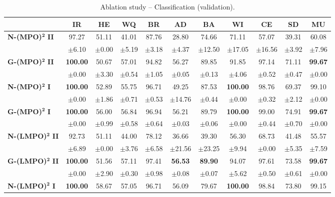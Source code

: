 \begin{table}[ht]
\centering
\small
\caption{Ablation study -- Classification (validation).}
\label{tab:ablation_classification}
\begin{tabular}{lcccccccccc}
\toprule
& IR & HE & WQ & BR & AD & BA & WI & CE & SD & MU \\
\midrule
\textbf{N-(MPO)}$\bm{^2}$ \textbf{II} & 97.27 & 51.11 & 41.01 & 87.76 & 28.80 & 74.66 & 71.11 & 57.07 & 39.31 & 60.08 \\
 & $\pm$6.10 & $\pm$0.00 & $\pm$5.19 & $\pm$3.18 & $\pm$4.37 & $\pm$12.50 & $\pm$17.05 & $\pm$16.56 & $\pm$3.92 & $\pm$7.96 \\
\midrule
\textbf{G-(MPO)}$\bm{^2}$ \textbf{II} & \textbf{100.00} & 50.67 & 57.01 & 94.82 & 56.27 & 89.85 & 91.85 & 97.14 & 71.11 & \textbf{99.67} \\
 & $\pm$0.00 & $\pm$3.30 & $\pm$0.54 & $\pm$1.05 & $\pm$0.05 & $\pm$0.13 & $\pm$4.06 & $\pm$0.52 & $\pm$0.47 & $\pm$0.00 \\
\midrule
\textbf{N-(MPO)}$\bm{^2}$ \textbf{I} & \textbf{100.00} & 52.89 & 55.75 & 96.71 & 49.25 & 87.53 & \textbf{100.00} & 98.76 & 69.37 & 99.10 \\
 & $\pm$0.00 & $\pm$1.86 & $\pm$0.71 & $\pm$0.53 & $\pm$14.76 & $\pm$0.44 & $\pm$0.00 & $\pm$0.32 & $\pm$2.12 & $\pm$0.00 \\
\midrule
\textbf{G-(MPO)}$\bm{^2}$ \textbf{I} & \textbf{100.00} & 56.00 & 56.84 & 96.94 & 56.21 & 89.79 & \textbf{100.00} & 99.00 & 74.91 & \textbf{99.67} \\
 & $\pm$0.00 & $\pm$0.99 & $\pm$0.58 & $\pm$0.64 & $\pm$0.03 & $\pm$0.06 & $\pm$0.00 & $\pm$0.44 & $\pm$0.70 & $\pm$0.00 \\
\midrule
\textbf{N-(LMPO)}$\bm{^2}$ \textbf{II} & 92.73 & 51.11 & 44.00 & 78.12 & 36.66 & 39.30 & 56.30 & 68.73 & 41.48 & 55.57 \\
 & $\pm$6.89 & $\pm$0.00 & $\pm$3.76 & $\pm$6.58 & $\pm$21.56 & $\pm$23.25 & $\pm$9.94 & $\pm$0.00 & $\pm$5.35 & $\pm$7.59 \\
\midrule
\textbf{G-(LMPO)}$\bm{^2}$ \textbf{II} & \textbf{100.00} & 51.56 & 57.11 & 97.41 & \textbf{56.53} & \textbf{89.90} & 94.07 & 97.61 & 73.58 & \textbf{99.67} \\
 & $\pm$0.00 & $\pm$2.90 & $\pm$0.30 & $\pm$0.98 & $\pm$0.08 & $\pm$0.07 & $\pm$5.62 & $\pm$0.50 & $\pm$0.61 & $\pm$0.00 \\
\midrule
\textbf{N-(LMPO)}$\bm{^2}$ \textbf{I} & \textbf{100.00} & 58.67 & 57.05 & 96.71 & 56.09 & 79.67 & \textbf{100.00} & 98.84 & 73.80 & 99.15 \\

\end{tabular}
\end{table}
